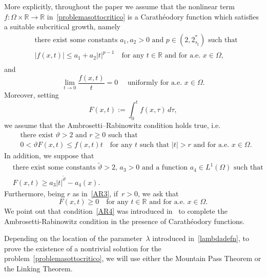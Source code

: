\documentclass[12pt,a4paper,intlimits,sumlimits]{amsart}
\def \R {\mathbb{R}}
\theoremstyle{definition}
\theoremstyle{plain}
\numberwithin{equation}{section}
\renewcommand{\leq}{\leqslant}
\renewcommand{\geq}{\geqslant}
\begin{document}
More explicitly,
throughout the paper we assume that the nonlinear term~$f:\Omega\times \R \to \R$ in~\eqref{problemasottocritico} is a Carath\'eodory function which satisfies a suitable subcritical growth, namely
\begin{equation}\label{AR1}
\begin{split}
&\mbox{there exist some constants $a_1,a_2>0$ and $p\in (2, 2^*_{s_\sharp})$ such that} \\
&|f(x,t)|\leq a_1+a_2|t|^{p-1} \quad\mbox{for any } t\in \R \mbox{ and for a.e. } x\in \Omega,\\
\end{split}
\end{equation}
and
\begin{equation}\label{AR2}
\lim_{t\to 0}\frac{f(x,t)}{t}=0  \quad \mbox{ uniformly for a.e. } x\in \Omega.
\end{equation}
Moreover, setting
\begin{equation}\label{definizioneF}
F(x,t):=\int_0^t f(x,\tau)\,d\tau,
\end{equation}
we assume that the Ambrosetti--Rabinowitz condition holds true, i.e.
\begin{equation}\label{AR3}
\begin{split}
&\mbox{there exist $\vartheta>2$ and $r\geq 0$ such that}\\
&0<\vartheta F(x,t)\leq f(x,t)t  \quad\mbox{for any } t \mbox{ such that } |t|> r \mbox{ and for a.e. } x\in \Omega.
\end{split}
\end{equation}
In addition, we suppose that 
\begin{equation}\label{AR4}
\begin{split}
&\mbox{there exist some constants~$\widetilde{\vartheta}>2$, $a_3>0$ and a function~$a_4\in L^1(\Omega)$ such that}\\
&F(x,t)\geq a_3|t|^{\widetilde{\vartheta}}-a_4(x).
\end{split}
\end{equation}
Furthermore, being $r$ as in~\eqref{AR3}, if~$r>0$, we ask that
\begin{equation}\label{AR5}
F(x,t)\geq 0  \quad\mbox{for any } t\in \R \mbox{ and for a.e. } x\in \Omega.
\end{equation}
We point out that condition~\eqref{AR4} was introduced in~\cite{addendum}
to complete the Ambrosetti-Rabinowitz condition in the presence
of Carath\'eodory functions.

Depending on the location of the parameter~$\lambda$ introduced in~\eqref{lambdadefn}, to prove the existence of a nontrivial solution for the problem~\eqref{problemasottocritico}, we will use either the Mountain Pass Theorem or the Linking Theorem.
\end{document}
